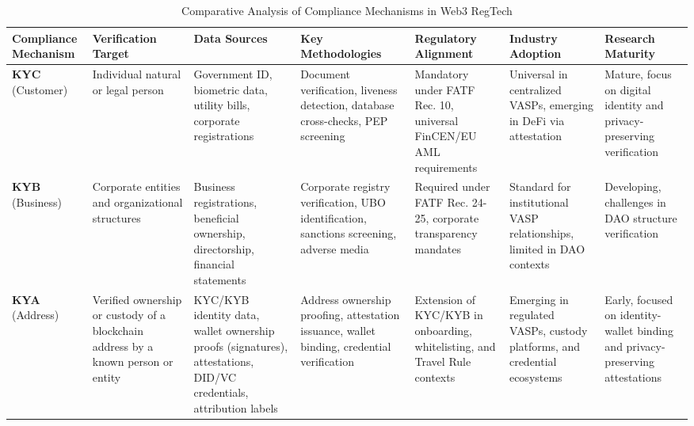 \documentclass[conference,compsoc]{IEEEtran}
\begin{document}
\begin{table}[t]
\centering
\caption{Comparative Analysis of Compliance Mechanisms in Web3 RegTech}
\label{tab:compliance_comparison}
\scriptsize
\begin{tabularx}{\textwidth}{XXXXp{2.35cm}XX}
\toprule
\textbf{Compliance Mechanism} & \textbf{Verification Target} & \textbf{Data Sources} & \textbf{Key Methodologies} & \textbf{Regulatory Alignment} & \textbf{Industry Adoption} & \textbf{Research Maturity} \\
\midrule
\textbf{KYC} (Customer) & Individual natural or legal person \cite{financialactiontaskforcefatf2012internationalstandardscombating} & Government ID, biometric data, utility bills, corporate registrations & Document verification, liveness detection, database cross-checks, PEP screening \cite{charoenwong2024regtechtechnologydrivencompliance} & Mandatory under FATF Rec. 10, universal FinCEN/EU AML requirements \cite{force2021updatedguidanceriskbased} & Universal in centralized VASPs, emerging in DeFi via attestation & Mature, focus on digital identity and privacy-preserving verification \cite{reed2022decentralizedidentifiersdids,yang2024researchidentitydata} \\
\midrule
\textbf{KYB} (Business) & Corporate entities and organizational structures \cite{financialactiontaskforcefatf2012internationalstandardscombating} & Business registrations, beneficial ownership, directorship, financial statements & Corporate registry verification, UBO identification, sanctions screening, adverse media & Required under FATF Rec. 24-25, corporate transparency mandates \cite{force2021updatedguidanceriskbased} & Standard for institutional VASP relationships, limited in DAO contexts \cite{voshmgir2020tokeneconomyhow} & Developing, challenges in DAO structure verification \cite{werbach2018trustverifywhy} \\
\midrule
\textbf{KYA} (Address) & Verified ownership or custody of a blockchain address by a known person or entity & KYC/KYB identity data, wallet ownership proofs (signatures), attestations, DID/VC credentials, attribution labels & Address ownership proofing, attestation issuance, wallet binding, credential verification \cite{reed2022decentralizedidentifiersdids,camenisch2001efficientsystemnontransferable} & Extension of KYC/KYB in onboarding, whitelisting, and Travel Rule contexts & Emerging in regulated VASPs, custody platforms, and credential ecosystems & Early, focused on identity-wallet binding and privacy-preserving attestations \cite{yang2024researchidentitydata} \\

\end{tabularx}
\end{table}
\end{document}
